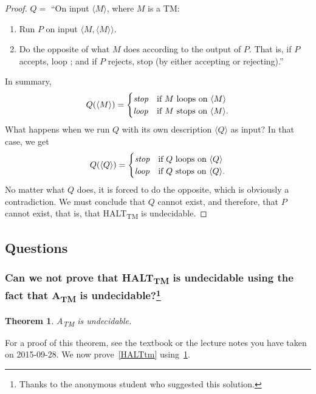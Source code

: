 \documentclass{article}
\newcommand{\theoremname}{Theorem}
\newtheorem{theorem}{\theoremname}
\newcommand{\TM}{TM}
\newcommand{\Atm}{A\textsubscript{TM}}
\newcommand{\HALTtm}{HALT\textsubscript{TM}}
\begin{document}
\begin{proof}
\(Q =\) ``On input \(\langle M \rangle\), where \(M\) is a \TM{}:
\begin{enumerate}
	\item Run \(P\) on input \(\langle M, \langle M \rangle \rangle\).
	\item Do the opposite of what \(M\) does according to the output of
		\(P\). That is, if \(P\) accepts, loop ; and if \(P\) rejects, stop (by
		either accepting or rejecting).''
\end{enumerate}
In summary,
\begin{displaymath}
	Q(\langle M\rangle) = \begin {cases}
	\emph{stop}&\text{if \(M\) loops on \(\langle M\rangle\)}\\
	\emph{loop}&\text{if \(M\) stops on \(\langle M\rangle\).}
\end{cases}
\end{displaymath}
What happens when we run \(Q\) with its own description \(\langle Q\rangle\) as input? In that
case, we get
\begin{displaymath}
Q(\langle Q\rangle) = \begin {cases}
\emph{stop}&\text{if \(Q\) loops on \(\langle Q\rangle\)}\\
\emph{loop}&\text{if \(Q\) stops on \(\langle Q\rangle\).}
\end{cases}
\end{displaymath}
No matter what \(Q\) does, it is forced to do the opposite, which is obviously a
contradiction. We must conclude that \(Q\) cannot exist, and therefore, that
\(P\) cannot exist, that is, that \HALTtm{} is undecidable.
\end{proof}
\subsection{Questions}
\subsubsection{Can we not prove that \HALTtm{} is undecidable using the fact
that \Atm{} is undecidable?\footnote{%
Thanks to the anonymous student who suggested this solution.%
}}

\begin{theorem}\label{Atm}
\Atm{} is undecidable.
\end{theorem}

For a proof of this theorem, see the textbook or the lecture notes you have taken
on 2015-09-28. We now prove~\ref{HALTtm} using~\ref{Atm}.
\end{document}
